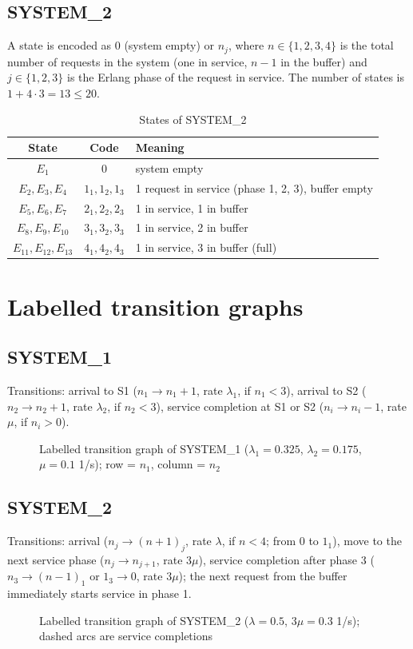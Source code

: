 \documentclass[12pt,a4paper]{article}
\begin{document}
\subsection{SYSTEM\_2}
A state is encoded as $0$ (system empty) or $n_j$, where $n \in \{1,2,3,4\}$ is the total number of
requests in the system (one in service, $n-1$ in the buffer) and $j\in\{1,2,3\}$ is the Erlang phase of
the request in service. The number of states is $1 + 4\cdot3 = 13 \le 20$.

\begin{table}[H]
\centering\small
\caption{States of SYSTEM\_2}
\begin{tabular}{ccl}
\toprule
State & Code & Meaning \\
\midrule
$E_1$ & 0 & system empty \\
$E_2,E_3,E_4$ & $1_1, 1_2, 1_3$ & 1 request in service (phase 1, 2, 3), buffer empty \\
$E_5,E_6,E_7$ & $2_1, 2_2, 2_3$ & 1 in service, 1 in buffer \\
$E_8,E_9,E_{10}$ & $3_1, 3_2, 3_3$ & 1 in service, 2 in buffer \\
$E_{11},E_{12},E_{13}$ & $4_1, 4_2, 4_3$ & 1 in service, 3 in buffer (full) \\
\bottomrule
\end{tabular}
\end{table}

\section{Labelled transition graphs}
\subsection{SYSTEM\_1}
Transitions: arrival to S1 ($n_1\to n_1+1$, rate $\lambda_1$, if $n_1<3$), arrival to S2
($n_2\to n_2+1$, rate $\lambda_2$, if $n_2<3$), service completion at S1 or S2
($n_i\to n_i-1$, rate $\mu$, if $n_i>0$).
\begin{figure}[H]
\centering
\resizebox{0.92\textwidth}{!}{\graphOne}
\caption{Labelled transition graph of SYSTEM\_1 ($\lambda_1=0.325$, $\lambda_2=0.175$, $\mu=0.1$ 1/s); row = $n_1$, column = $n_2$}
\end{figure}

\subsection{SYSTEM\_2}
Transitions: arrival ($n_j \to (n+1)_j$, rate $\lambda$, if $n<4$; from $0$ to $1_1$),
move to the next service phase ($n_j \to n_{j+1}$, rate $3\mu$), service completion after phase 3
($n_3 \to (n-1)_1$ or $1_3 \to 0$, rate $3\mu$); the next request from the buffer immediately
starts service in phase 1.
\begin{figure}[H]
\centering
\resizebox{0.85\textwidth}{!}{\graphTwo}
\caption{Labelled transition graph of SYSTEM\_2 ($\lambda=0.5$, $3\mu=0.3$ 1/s); dashed arcs are service completions}
\end{figure}
\end{document}
